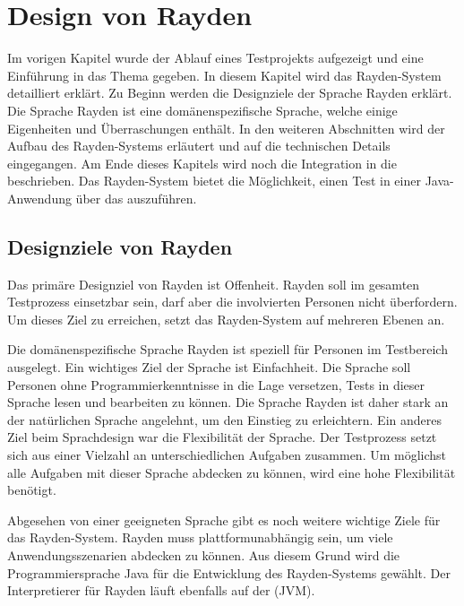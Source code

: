\chapter{Design von Rayden}
\label{cha:Design}

Im vorigen Kapitel wurde der Ablauf eines Testprojekts aufgezeigt und eine Einführung in das Thema  gegeben. In diesem Kapitel wird das Rayden-System detailliert erklärt. Zu Beginn werden die Designziele der Sprache Rayden erklärt. Die Sprache Rayden ist eine domänenspezifische Sprache, welche einige Eigenheiten und Überraschungen enthält. In den weiteren Abschnitten wird der Aufbau des Rayden-Systems erläutert und auf die technischen Details eingegangen. Am Ende dieses Kapitels wird noch die Integration in die  \cite{JavaScriptApi} beschrieben. Das Rayden-System bietet die Möglichkeit, einen Test in einer Java-Anwendung über das  auszuführen.


\section{Designziele von Rayden}

Das primäre Designziel von Rayden ist Offenheit. Rayden soll im gesamten Testprozess einsetzbar sein, darf aber die involvierten Personen nicht überfordern. Um dieses Ziel zu erreichen, setzt das Rayden-System auf mehreren Ebenen an.

\SuperPar
Die domänenspezifische Sprache Rayden ist speziell für Personen im Testbereich ausgelegt. Ein wichtiges Ziel der Sprache ist Einfachheit. Die Sprache soll Personen ohne Programmierkenntnisse in die Lage versetzen, Tests in dieser Sprache lesen und bearbeiten zu können. Die Sprache Rayden ist daher stark an der natürlichen Sprache angelehnt, um den Einstieg zu erleichtern. Ein anderes Ziel beim Sprachdesign war die Flexibilität der Sprache. Der Testprozess setzt sich aus einer Vielzahl an unterschiedlichen Aufgaben zusammen. Um möglichst alle Aufgaben mit dieser Sprache abdecken zu können, wird eine hohe Flexibilität benötigt. 

\SuperPar
Abgesehen von einer geeigneten Sprache gibt es noch weitere wichtige Ziele für das Rayden-System. Rayden muss plattformunabhängig sein, um viele Anwendungsszenarien abdecken zu können. Aus diesem Grund wird die Programmiersprache Java für die Entwicklung des Rayden-Systems gewählt. Der Interpretierer für Rayden läuft ebenfalls auf der  (JVM).

